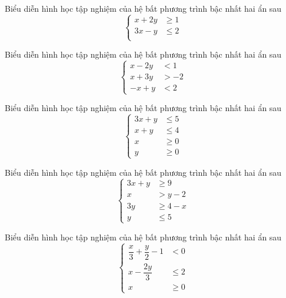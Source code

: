 \begin{bt}%
	Biểu diễn hình học tập nghiệm của hệ bất phương trình bậc nhất hai ẩn sau
	$$\left\{\begin{aligned}
	x+2y &\geq 1\\
	3x-y & \leq 2 \\
	\end{aligned}\right.$$
\end{bt}
\begin{bt}%
	Biểu diễn hình học tập nghiệm của hệ bất phương trình bậc nhất hai ẩn sau
	$$\left\{\begin{aligned}
	x-2y &< 1\\
	x+3y &>-2 \\
	-x+y &<2
	\end{aligned}\right.$$
\end{bt}
\begin{bt}%
	Biểu diễn hình học tập nghiệm của hệ bất phương trình bậc nhất hai ẩn sau
	$$\left\{\begin{aligned}
	3x+y & \leq 5\\
	x+y & \leq 4 \\
	x &\geq 0\\
	y &\geq 0
	\end{aligned}\right.$$
\end{bt}
\begin{bt}%
	Biểu diễn hình học tập nghiệm của hệ bất phương trình bậc nhất hai ẩn sau
	$$\left\{\begin{aligned}
	3x+y &\geq 9\\
	x &> y-2 \\
	3y &\geq 4-x\\
	y &\leq 5
	\end{aligned}\right.$$
\end{bt}
\begin{bt}%
	Biểu diễn hình học tập nghiệm của hệ bất phương trình bậc nhất hai ẩn sau
	$$\left\{\begin{aligned}
	\dfrac{x}{3}+\dfrac{y}{2}-1 &< 0\\
	x-\dfrac{2y}{3}&\leq 2\\
	x &\geq 0
	\end{aligned}\right.$$
\end{bt}

